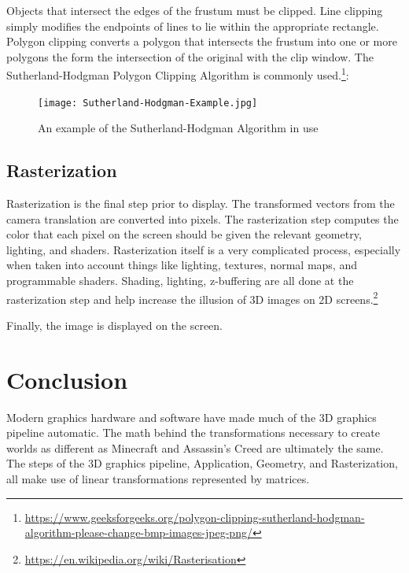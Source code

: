 \documentclass{article}
\begin{document}
Objects that intersect the edges of the frustum must be clipped. Line clipping simply modifies the endpoints of lines to lie within the appropriate rectangle. Polygon clipping converts a polygon that intersects the frustum into one or more polygons the form the intersection of the original with the clip window. The Sutherland-Hodgman Polygon Clipping Algorithm is commonly used.\footnote{\url{https://www.geeksforgeeks.org/polygon-clipping-sutherland-hodgman-algorithm-please-change-bmp-images-jpeg-png/}}:

\begin{figure}[H]
    \centering
    \texttt{[image: Sutherland-Hodgman-Example.jpg]}
    \caption{An example of the Sutherland-Hodgman Algorithm in use}
    \label{Sutherland-Hodgman}
\end{figure}

\subsection{Rasterization}
Rasterization is the final step prior to display. The transformed vectors from the camera translation are converted into pixels. The rasterization step computes the color that each pixel on the screen should be given the relevant geometry, lighting, and shaders. Rasterization itself is a very complicated process, especially when taken into account things like lighting, textures, normal maps, and programmable shaders. Shading, lighting, z-buffering are all done at the rasterization step and help increase the illusion of 3D images on 2D screens.\footnote{\url{https://en.wikipedia.org/wiki/Rasterisation}}

Finally, the image is displayed on the screen.

\section{Conclusion}
Modern graphics hardware and software have made much of the 3D graphics pipeline automatic. The math behind the transformations necessary to create worlds as different as Minecraft and Assassin's Creed are ultimately the same. The steps of the 3D graphics pipeline, Application, Geometry, and Rasterization, all make use of linear transformations represented by matrices.
\end{document}
